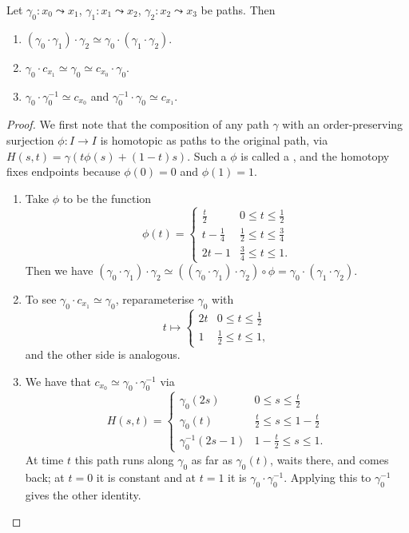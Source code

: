 \begin{lemma} \label{lem:group-op}
	Let $\gamma_0: x_0 \leadsto x_1$, $\gamma_1: x_1 \leadsto x_2$, $\gamma_2: x_2 \leadsto x_3$ be paths.
	Then
	\begin{enumerate}
		\item $(\gamma_0 \cdot \gamma_1) \cdot \gamma_2 \simeq \gamma_0 \cdot (\gamma_1 \cdot \gamma_2)$.
		\item $\gamma_0 \cdot c_{x_1} \simeq \gamma_0 \simeq c_{x_0} \cdot \gamma_0$.
		\item $\gamma_0 \cdot \gamma_0^{-1} \simeq c_{x_0}$ and $\gamma_0^{-1} \cdot \gamma_0 \simeq c_{x_1}$.
	\end{enumerate}
\end{lemma}
\begin{proof}
	We first note that the composition of any path $\gamma$ with an order-preserving surjection $\phi: I \rightarrow I$ is homotopic as paths to the original path, via $H(s, t) = \gamma(t\phi(s) + (1 - t)s)$. Such a $\phi$ is called a , and the homotopy fixes endpoints because $\phi(0) = 0$ and $\phi(1) = 1$.
	\begin{enumerate}
		\item Take $\phi$ to be the function
		$$
		\phi(t)=\begin{cases}
			\frac{t}{2} & 0 \leq t \leq \frac{1}{2} \\
			t - \frac{1}{4} & \frac{1}{2} \leq t \leq \frac{3}{4} \\
			2t - 1 & \frac{3}{4} \leq t \leq 1.
		\end{cases}
		$$
		Then we have $(\gamma_0 \cdot \gamma_1) \cdot \gamma_2 \simeq ((\gamma_0 \cdot \gamma_1) \cdot \gamma_2) \circ \phi = \gamma_0 \cdot (\gamma_1 \cdot \gamma_2)$.
		\item To see $\gamma_0 \cdot c_{x_1} \simeq \gamma_0$, reparameterise $\gamma_0$ with
		$$
		t \mapsto \begin{cases}
			2t & 0 \leq t \leq \frac{1}{2} \\
			1 & \frac{1}{2} \leq t \leq 1,
		\end{cases}
		$$
		and the other side is analogous.
		\item We have that $c_{x_0} \simeq \gamma_0 \cdot \gamma_0^{-1}$ via
		$$
		H(s, t) = \begin{cases}
			\gamma_0(2s) & 0 \leq s \leq \frac{t}{2} \\
			\gamma_0(t) & \frac{t}{2} \leq s \leq 1 - \frac{t}{2} \\
			\gamma_0^{-1}(2s - 1) & 1 - \frac{t}{2} \leq s \leq 1.
		\end{cases}
		$$
		At time $t$ this path runs along $\gamma_0$ as far as $\gamma_0(t)$, waits there, and comes back; at $t = 0$ it is constant and at $t=1$ it is $\gamma_0 \cdot \gamma_0^{-1}$. Applying this to $\gamma_0^{-1}$ gives the other identity. \qedhere
	\end{enumerate}
\end{proof}


